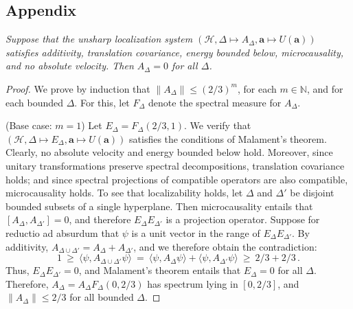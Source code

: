 \documentclass[11pt]{article}
\theoremstyle{remark}
\newcommand{\norm}[1]{\mbox{$\| #1\|$}}
\newcommand{\hil}[1]{\mathcal{#1}}
\begin{document}
\begin{appendix}
\section{Appendix}
 {\it Suppose that the unsharp
  localization system $(\hil{H},\Delta \mapsto
  A_{\Delta},\mathbf{a}\mapsto U(\mathbf{a}))$ satisfies additivity,
  translation covariance, energy bounded below, microcausality, and no
  absolute velocity.  Then $A_{\Delta}=0$ for all $\Delta$.  }

\begin{proof} We prove by induction that $\norm{A_{\Delta}}\leq
  (2/3)^{m}$, for each $m\in \mathbb{N}$, and for each bounded
  $\Delta$.  For this, let $F_{\Delta}$ denote the spectral measure
  for $A_{\Delta}$.
  
  (Base case: $m=1$) Let $E_{\Delta}=F_{\Delta }(2/3,1)$.  We verify
  that $(\hil{H},\Delta \mapsto E_{\Delta},\mathbf{a}\mapsto
  U(\mathbf{a}))$ satisfies the conditions of Malament's theorem.
  Clearly, no absolute velocity and energy bounded below hold.
  Moreover, since unitary transformations preserve spectral
  decompositions, translation covariance holds; and since spectral
  projections of compatible operators are also compatible,
  microcausality holds.  To see that localizability holds, let
  $\Delta$ and $\Delta '$ be disjoint bounded subsets of a single
  hyperplane.  Then microcausality entails that $[A_{\Delta},A_{\Delta
    '}]=0$, and therefore $E_{\Delta}E_{\Delta '}$ is a projection
  operator.  Suppose for reductio ad absurdum that $\psi$ is a unit
  vector in the range of $E_{\Delta}E_{\Delta '}$.  By additivity,
  $A_{\Delta \cup \Delta '}=A_{\Delta}+A_{\Delta '}$, and we therefore
  obtain the contradiction:
\begin{equation}
1 \:\geq \:\langle \psi,A_{\Delta \cup \Delta '}\psi \rangle
\: = \: \langle \psi ,A_{\Delta}\psi \rangle +\langle \psi ,A_{\Delta
  '}\psi \rangle \:\geq \: 2/3+2/3 \,.\end{equation}
Thus, $E_{\Delta}E_{\Delta '}=0$, and Malament's theorem entails
that $E_{\Delta }=0$ for all $\Delta$.  Therefore,
  $A_{\Delta}=A_{\Delta}F_{\Delta }(0,2/3)$ has spectrum lying in
  $[0,2/3]$, and $\norm{A_{\Delta}}\leq 2/3$ for all bounded $\Delta$.
  

\end{proof}
\end{appendix}
\end{document}
